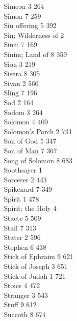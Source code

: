 Simeon \hfill 3 \quad \phantom{0}264\\
Simon \hfill 7 \quad \phantom{0}259\\
Sin offering \hfill 5 \quad \phantom{0}392\\
Sin; Wilderness of \hfill 2 \\
Sinai \hfill 7 \quad \phantom{0}169\\
Sinim; Land of \hfill 8 \quad \phantom{0}359\\
Sion \hfill 3 \quad \phantom{0}219\\
Sisera \hfill 8 \quad \phantom{0}305\\
Sivan \hfill 2 \quad \phantom{0}560\\
Sling \hfill 7 \quad \phantom{0}196\\
Sod \hfill 2 \quad \phantom{0}164\\
Sodom \hfill 3 \quad \phantom{0}264\\
Solomon \hfill 4 \quad \phantom{0}400\\
Solomon’s Porch \hfill 2 \quad \phantom{0}731\\
Son of God \hfill 5 \quad \phantom{0}347\\
Son of Man \hfill 7 \quad \phantom{0}367\\
Song of Solomon \hfill 8 \quad \phantom{0}683\\
Soothsayer \hfill 1 \\
Sorcerer \hfill 2 \quad \phantom{0}443\\
Spikenard \hfill 7 \quad \phantom{0}349\\
Spirit \hfill 1 \quad \phantom{0}478\\
Spirit; the Holy \hfill 4 \\
Stacte \hfill 5 \quad \phantom{0}509\\
Staff \hfill 7 \quad \phantom{0}313\\
Stater \hfill 2 \quad \phantom{0}596\\
Stephen \hfill 6 \quad \phantom{0}438\\
Stick of Ephraim \hfill 9 \quad \phantom{0}621\\
Stick of Joseph \hfill 3 \quad \phantom{0}651\\
Stick of Judah \hfill 1 \quad \phantom{0}721\\
Stoics \hfill 4 \quad \phantom{0}472\\
Stranger \hfill 3 \quad \phantom{0}543\\
Stuff \hfill 9 \quad \phantom{0}612\\
Succoth \hfill 8 \quad \phantom{0}674\\
